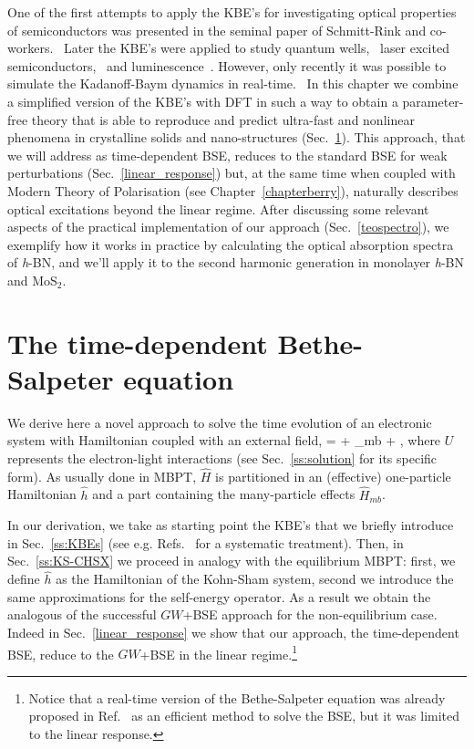 One of the first attempts to apply the KBE's for investigating optical properties of semiconductors was presented in the seminal paper of Schmitt-Rink and co-workers.~\cite{PhysRevB.37.941} 
Later the KBE's were applied to study quantum wells,~\cite{PhysRevB.58.2064} laser excited
semiconductors,~\cite{PhysRevB.38.9759} and luminescence~\cite{PhysRevLett.86.2451}. However, only recently it was possible to simulate the Kadanoff-Baym
dynamics in real-time.~\cite{Kohler1999123,PhysRevLett.103.176404,PhysRevLett.84.1768,PhysRevLett.98.153004} 
In this chapter we combine a simplified version of the KBE's with DFT in such a way to obtain a parameter-free theory that is able to reproduce and predict
ultra-fast and nonlinear phenomena in crystalline solids and nano-structures 
(Sec.~\ref{tdbse_section}). This approach, that we
will address as time-dependent BSE, reduces to the standard BSE for weak perturbations (Sec.~\ref{linear_response}) but, at the same time when coupled
with Modern Theory of Polarisation (see Chapter~\ref{chapterberry}), naturally describes optical excitations beyond the linear regime. 
After discussing some relevant aspects of the practical implementation of our approach (Sec.~\ref{teospectro}), we 
exemplify how it works in practice by calculating the optical absorption spectra of {\it h}-BN, and we'll apply it to the 
second harmonic generation in monolayer {\it h}-BN and MoS$_2$.

\section{The time-dependent Bethe-Salpeter equation}
\label{tdbse_section}                                        
We derive here a novel approach to solve the time evolution of an electronic
system with Hamiltonian coupled with an external field,
\be
\label{hamiltonian}
 =  + _{mb} + ,     
\ee
where $U$ represents the electron-light interactions (see
Sec.~\ref{ss:solution} for its specific form). As usually done in MBPT, $\hat{H}$
is partitioned in an (effective) one-particle Hamiltonian
$\hat h$ and a part containing the many-particle effects $\hat{H}_{mb}$. 

In our derivation, we take as starting point the KBE's that we briefly introduce in
Sec.~\ref{ss:KBEs} (see e.g. Refs.~\cite{kremp} for a systematic
treatment). Then, in Sec.~\ref{ss:KS-CHSX} we proceed in analogy with
the equilibrium MBPT: first, we define $\hat h$ as the Hamiltonian of the Kohn-Sham
system, second we introduce the same approximations for the
self-energy operator. As a result we obtain the analogous of the
successful $GW$+BSE approach for the non-equilibrium case. Indeed in
Sec.~\ref{linear_response} we show that our approach, the
time-dependent BSE, reduce to the $GW$+BSE in the linear regime.\footnote{Notice that a real-time version
        of the Bethe-Salpeter equation was already proposed in Ref.~\cite{PhysRevB.67.085307} as
an efficient method to solve the BSE, but it was limited to the linear response.}

